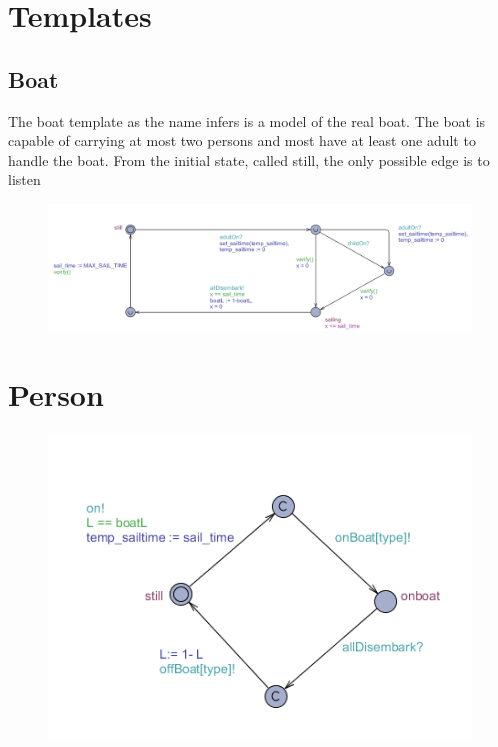 \section{Templates}




\subsection{Boat}
The boat template as the name infers is a model of the real boat. The boat is capable of carrying at most two persons and most have at least one adult to handle the boat. From the initial state, called still, the only possible edge is to listen 
\begin{figure}%
\includegraphics[width=\columnwidth]{pictures/boat.png}%
\caption{}%
\label{}%
\end{figure}
















\section{Person}
\begin{figure}%
\includegraphics[width=\columnwidth]{pictures/person.png}%
\caption{}%
\label{}%
\end{figure}



















